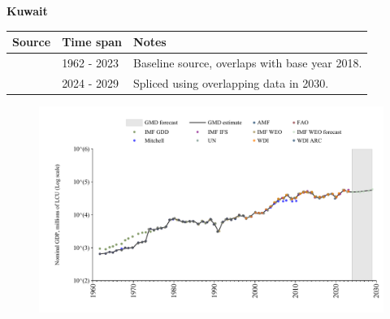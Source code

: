 \documentclass[12pt,a4paper,landscape]{article}
\begin{document}
\begin{adjustbox}{max totalsize={\paperwidth}{\paperheight},center}
\begin{minipage}[t][\textheight][t]{\textwidth}
\vspace*{0.5cm}
{}
\begin{center}
{\Large\bfseries Kuwait}
\end{center}
\vspace{0.5cm}
\begin{table}[H]
\centering
\small
\begin{tabular}{|l|l|l|}
\hline
\textbf{Source} & \textbf{Time span} & \textbf{Notes} \\
\hline
\rowcolor{white}\cite{WDI}& 1962 - 2023 &Baseline source, overlaps with base year 2018.\\
\rowcolor{lightgray}\cite{IMF_WEO_forecast}& 2024 - 2029 &Spliced using overlapping data in 2030.\\
\hline
\end{tabular}
\end{table}
\begin{figure}[H]
\centering
\includegraphics[width=\textwidth,height=0.6\textheight,keepaspectratio]{graphs/KWT_nGDP.pdf}
\end{figure}
\end{minipage}
\end{adjustbox}
\end{document}
